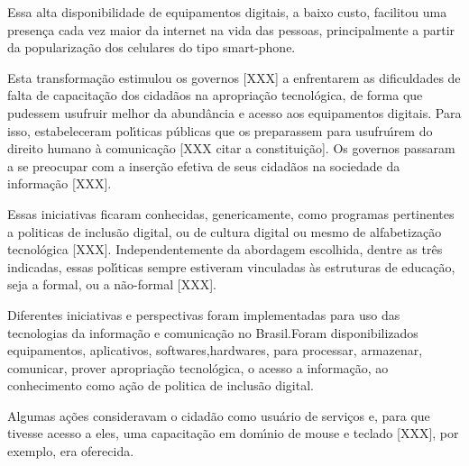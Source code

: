 \documentclass[
12pt,		%
openright,	%
twoside,  %
a4paper,			%
chapter=TITLE,		%
english,			%
french,				%
spanish,			%
brazil				%
]{USPSC-classe/USPSC_RedarTex}
\begin{document}
Essa alta disponibilidade de equipamentos digitais, a baixo custo, facilitou uma presen\c{c}a cada vez maior da internet na vida das pessoas, principalmente a partir da populariza\c{c}\~ao dos celulares do tipo \textquotedbl smart-phone.










Esta transforma\c{c}\~ao estimulou os governos [XXX] a enfrentarem as dificuldades  de falta de  capacita\c{c}\~ao dos cidad\~aos na apropria\c{c}\~ao tecnol\'ogica, de forma que pudessem usufruir melhor da abund\^ancia e acesso aos equipamentos digitais. Para isso, estabeleceram pol\'{\i}ticas p\'ublicas que os preparassem para usufru\'{\i}rem do direito humano \`a comunica\c{c}\~ao [XXX citar a constitui\c{c}\~ao]. Os governos passaram a se preocupar com a inser\c{c}\~ao efetiva de seus cidad\~aos na sociedade da informa\c{c}\~ao [XXX].










Essas iniciativas ficaram conhecidas, genericamente, como programas pertinentes a politicas de \textquotedbl inclus\~ao digital, ou  de \textquotedbl cultura digital ou mesmo de \textquotedbl alfabetiza\c{c}\~ao tecnol\'ogica [XXX]. Independentemente da abordagem escolhida, dentre as tr\^es indicadas, essas pol\'{\i}ticas sempre estiveram vinculadas \`as estruturas de educa\c{c}\~ao, seja a formal, ou a n\~ao-formal [XXX].










Diferentes iniciativas e perspectivas foram implementadas para uso das tecnologias da informa\c{c}\~ao e comunica\c{c}\~ao no Brasil.Foram disponibilizados equipamentos, aplicativos, softwares,hardwares, para processar, armazenar, comunicar, prover apropria\c{c}\~ao tecnol\'ogica, o acesso a  informa\c{c}\~ao, ao conhecimento como a\c{c}\~ao de politica de inclus\~ao digital.










Algumas a\c{c}\~oes consideravam o cidad\~ao como usu\'ario de servi\c{c}os e, para que tivesse acesso a eles, uma capacita\c{c}\~ao em dom\'{\i}nio de mouse e teclado [XXX], por exemplo, era oferecida.
\end{document}
